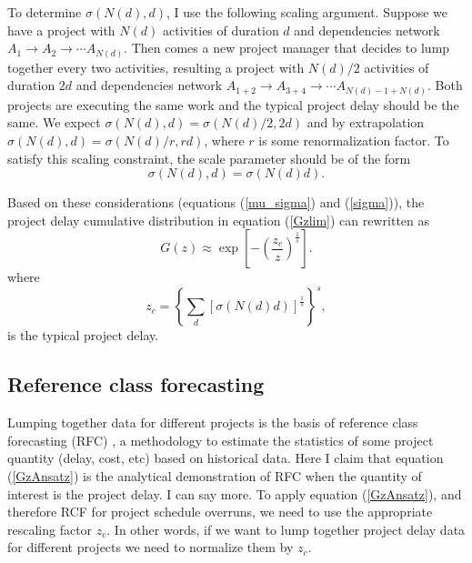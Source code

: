 \documentclass[11pt]{article}
\begin{document}
To determine $\sigma(N(d),d)$, I use the following scaling argument. Suppose we have a project with $N(d)$ activities of duration $d$ and dependencies network $A_1\rightarrow A_2\rightarrow \cdots A_{N(d)}$. Then comes a new project manager that decides to lump together every two activities, resulting a project with $N(d)/2$ activities of duration $2d$ and dependencies network $A_{1+2}\rightarrow A_{3+4}\rightarrow \cdots A_{N(d)-1 + N(d)}$. Both projects are executing the same work and the typical project delay should be the same. We expect $\sigma(N(d),d) = \sigma(N(d)/2,2d)$ and by extrapolation  $\sigma(N(d),d) = \sigma(N(d)/r,rd)$, where $r$ is some renormalization factor. To satisfy this scaling constraint, the scale parameter should be of the form
%
\begin{equation}
\sigma(N(d),d) = \sigma(N(d) d).
\label{sigma}
\end{equation}

Based on these considerations (equations (\ref{mu_sigma}) and (\ref{sigma})), the project delay cumulative distribution in equation (\ref{Gzlim}) can rewritten as
%
\begin{equation}
G(z) \approx \exp \left[ - \left( \frac{z_c}{z} \right)^{ \frac{1}{s} } \right].
\label{GzAnsatz}
\end{equation}
%
where
%
\begin{equation}
z_c = \left\{ \sum_d [\sigma(N(d)d)]^{ \frac{1}{s} } \right\}^s,
\label{zc}
\end{equation}
%
is the typical project delay.

\subsection{Reference class forecasting}

Lumping together data for different projects is the basis of reference class forecasting (RFC) \cite{flyvbjerg06, natarajan22, flyvbjerg22, baerenbold23}, a methodology to estimate the statistics of some project quantity (delay, cost, etc) based on historical data. Here I claim that equation (\ref{GzAnsatz}) is the analytical demonstration of RFC when the quantity of interest is the project delay. I can say more. To apply equation (\ref{GzAnsatz}), and therefore RCF for project schedule overruns, we need to use the appropriate rescaling factor $z_c$. In other words, if we want to lump together project delay data for different projects we need to normalize them by $z_c$. 
\end{document}
